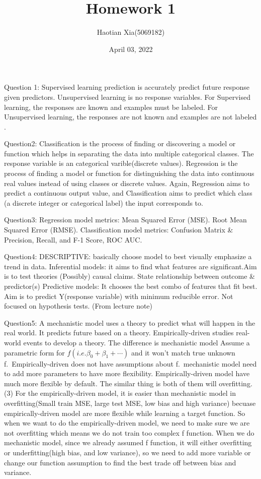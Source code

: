 \documentclass[
]{article}
\title{Homework 1}
\author{Haotian Xia(5069182)}
\date{April 03, 2022}
\begin{document}
\maketitle

Question 1: Supervised learning prediction is accurately predict future
response given predictors. Unsupervised learning is no response
variables. For Supervised learning, the responses are known and examples
must be labeled. For Unsupervised learning, the responses are not known
and examples are not labeled .

Question2: Classification is the process of finding or discovering a
model or function which helps in separating the data into multiple
categorical classes. The response variable is an categorical
varible(discrete values). Regression is the process of finding a model
or function for distinguishing the data into continuous real values
instead of using classes or discrete values. Again, Regression aims to
predict a continuous output value, and Classification aims to predict
which class (a discrete integer or categorical label) the input
corresponds to.

Question3: Regression model metrics: Mean Squared Error (MSE). Root Mean
Squared Error (RMSE). Classification model metrics: Confusion Matrix \&
Precision, Recall, and F-1 Score, ROC AUC.

Question4: DESCRIPTIVE: basically choose model to best visually
emphasize a trend in data. Inferential models: it aims to find what
features are significant.Aim is to test theories (Possibly) causal
claims. State relationship between outcome \& predictor(s) Predictive
models: It chooses the best combo of features that fit best. Aim is to
predict Y(response variable) with minimum reducible error. Not focused
on hypothesis tests. (From lecture note)

Question5: A mechanistic model uses a theory to predict what will happen
in the real world. It predicts future based on a theory.
Empirically-driven studies real-world events to develop a theory. The
difference is mechanistic model Assume a parametric form for
\(f(i.e.\beta_0+\beta_1+⋯)\) and it won't match true unknown
f.~Empirically-driven does not have assumptions about f.~mechanistic
model need to add more parameters to have more flexibility.
Empirically-driven model have much more flexible by default. The similar
thing is both of them will overfitting. (3) For the empirically-driven
model, it is easier than mechanistic model in overfitting(Small train
MSE, large test MSE, low bias and high variance) becuase
empirically-driven model are more flexible while learning a target
function. So when we want to do the empirically-driven model, we need to
make sure we are not overfitting which means we do not train too complex
f function. When we do mechanistic model, since we already assumed f
function, it will either overfitting or underfitting(high bias, and low
variance), so we need to add more variable or change our function
assumption to find the best trade off between bias and variance.
\end{document}
